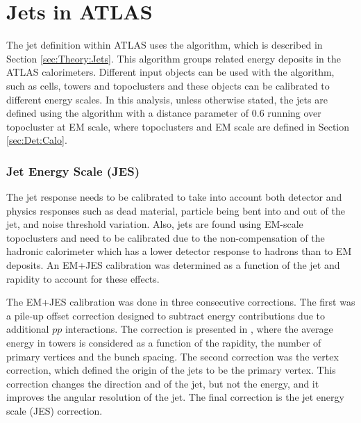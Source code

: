 \section{Jets in ATLAS}
\label{sec:Det:Jets}

The jet definition within ATLAS uses the \antikt{} algorithm, which is described in Section \ref{sec:Theory:Jets}. 
This algorithm groups related energy deposits in the ATLAS calorimeters.
Different input objects can be used with the \antikt{} algorithm, such as cells, towers and topoclusters and these objects can be calibrated to different energy scales.
In this analysis, unless otherwise stated, the jets are defined using the \antikt{} algorithm with a distance parameter of 0.6 running over topocluster at EM scale, where topoclusters and EM scale are defined in Section \ref{sec:Det:Calo}.


\subsubsection{Jet Energy Scale (JES)}

The jet response needs to be calibrated to take into account both detector and physics responses such as dead material, particle being bent into and  out of the jet, and noise threshold variation. 
Also, jets are found using EM-scale topoclusters and need to be calibrated due to the non-compensation of the hadronic calorimeter which has a lower detector response to hadrons than to EM deposits.
An EM+JES calibration was determined as a function of the jet \pt{} and rapidity to account for these effects.

The EM+JES calibration was done in three consecutive corrections.
The first was a pile-up offset correction designed to subtract energy contributions due to additional $pp$ interactions.
The correction is presented in \cite{ref:OffsetCorrection}, where the average energy in towers is considered as a function of the rapidity, the number of primary vertices and the bunch spacing.
The second correction was the vertex correction, which defined the origin of the jets to be the primary vertex.
This correction changes the direction and \pt{} of the jet, but not the energy, and it improves the angular resolution of the jet.
The final correction is the jet energy scale (JES) correction.


